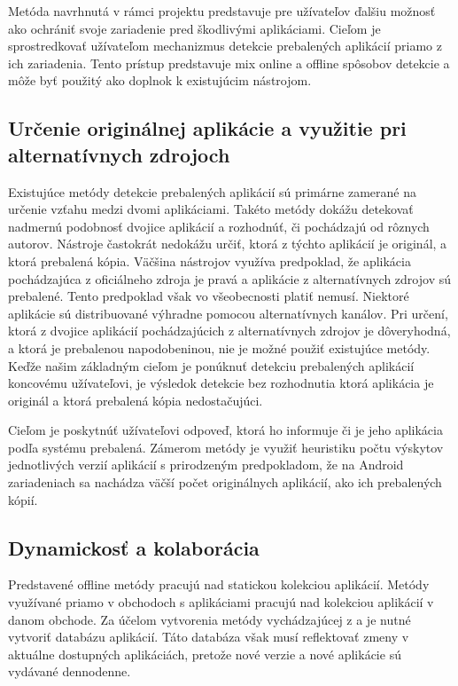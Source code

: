 Metóda navrhnutá v rámci projektu  predstavuje pre užívateľov ďalšiu možnosť ako ochrániť svoje zariadenie pred škodlivými aplikáciami. Cieľom je sprostredkovať užívateľom mechanizmus detekcie prebalených aplikácií priamo z ich zariadenia. Tento prístup predstavuje  mix online a offline spôsobov detekcie a môže byť použitý ako doplnok k existujúcim nástrojom.


\subsection*{Určenie originálnej aplikácie a využitie pri alternatívnych zdrojoch}

Existujúce metódy detekcie prebalených aplikácií sú primárne zamerané na určenie vzťahu medzi dvomi aplikáciami. Takéto metódy dokážu detekovať nadmernú podobnosť dvojice aplikácií a rozhodnúť, či pochádzajú od rôznych autorov. Nástroje častokrát nedokážu určiť, ktorá z týchto aplikácií je originál, a ktorá prebalená kópia. Väčšina nástrojov využíva predpoklad, že aplikácia pochádzajúca z oficiálneho zdroja  je pravá a aplikácie z alternatívnych zdrojov sú prebalené. Tento predpoklad však vo všeobecnosti platiť nemusí. Niektoré aplikácie sú distribuované výhradne pomocou alternatívnych kanálov. Pri určení, ktorá z dvojice aplikácií pochádzajúcich z alternatívnych zdrojov je dôveryhodná, a ktorá je prebalenou napodobeninou, nie je možné použiť existujúce metódy. Keďže našim základným cieľom je ponúknuť detekciu prebalených aplikácií koncovému užívateľovi, je výsledok detekcie bez rozhodnutia ktorá aplikácia je originál a ktorá prebalená kópia nedostačujúci. 


Cieľom je poskytnúť užívateľovi odpoveď, ktorá ho informuje či je jeho aplikácia podľa systému  prebalená. 
Zámerom metódy  je využiť heuristiku počtu výskytov jednotlivých verzií aplikácií s prirodzeným predpokladom, že na Android zariadeniach sa nachádza väčší počet originálnych aplikácií, ako ich prebalených kópií. 

\subsection*{Dynamickosť a kolaborácia}
Predstavené offline metódy pracujú nad statickou kolekciou aplikácií. Metódy využívané priamo v obchodoch s aplikáciami pracujú nad kolekciou aplikácií v danom obchode. Za účelom vytvorenia metódy vychádzajúcej z  a  je nutné vytvoriť databázu aplikácií. Táto databáza však musí reflektovať zmeny v aktuálne dostupných aplikáciách, pretože nové verzie a nové aplikácie sú vydávané dennodenne. 



